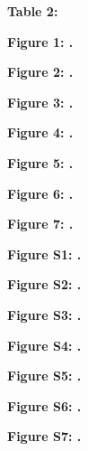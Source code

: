 \documentclass[12pt,]{article}
\begin{document}
\normalsize
\newpage

\textbf{Table 2: }

\footnotesize

\normalsize
\newpage

\textbf{Figure 1: .}

\textbf{Figure 2: .}

\textbf{Figure 3: .}

\textbf{Figure 4: .}

\textbf{Figure 5: .}

\textbf{Figure 6: .}

\textbf{Figure 7: .}

\newpage

\textbf{Figure S1: .}

\textbf{Figure S2: .}

\textbf{Figure S3: .}

\textbf{Figure S4: .}

\textbf{Figure S5: .}

\textbf{Figure S6: .}

\textbf{Figure S7: .}

\newpage
\end{document}
